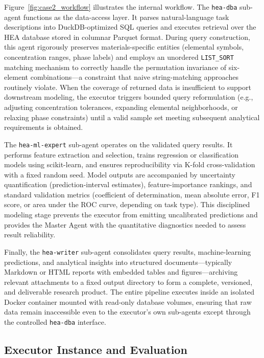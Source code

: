 \documentclass{article}
\begin{document}
Figure~\ref{fig:case2_workflow} illustrates the internal workflow. The \texttt{hea-dba} sub-agent functions as the data-access layer. It parses natural-language task descriptions into DuckDB-optimized SQL queries and executes retrieval over the HEA database stored in columnar Parquet format. During query construction, this agent rigorously preserves materials-specific entities (elemental symbols, concentration ranges, phase labels) and employs an unordered \texttt{LIST\_SORT} matching mechanism to correctly handle the permutation invariance of six-element combinations---a constraint that naive string-matching approaches routinely violate. When the coverage of returned data is insufficient to support downstream modeling, the executor triggers bounded query reformulation (e.g., adjusting concentration tolerances, expanding elemental neighborhoods, or relaxing phase constraints) until a valid sample set meeting subsequent analytical requirements is obtained.

The \texttt{hea-ml-expert} sub-agent operates on the validated query results. It performs feature extraction and selection, trains regression or classification models using scikit-learn, and ensures reproducibility via K-fold cross-validation with a fixed random seed. Model outputs are accompanied by uncertainty quantification (prediction-interval estimates), feature-importance rankings, and standard validation metrics (coefficient of determination, mean absolute error, F1 score, or area under the ROC curve, depending on task type). This disciplined modeling stage prevents the executor from emitting uncalibrated predictions and provides the Master Agent with the quantitative diagnostics needed to assess result reliability.

Finally, the \texttt{hea-writer} sub-agent consolidates query results, machine-learning predictions, and analytical insights into structured documents---typically Markdown or HTML reports with embedded tables and figures---archiving relevant attachments to a fixed output directory to form a complete, versioned, and deliverable research product. The entire pipeline executes inside an isolated Docker container mounted with read-only database volumes, ensuring that raw data remain inaccessible even to the executor's own sub-agents except through the controlled \texttt{hea-dba} interface.

\subsection{Executor Instance and Evaluation}
\end{document}
